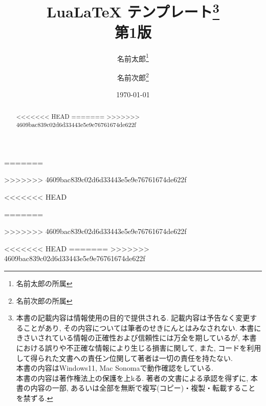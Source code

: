 \documentclass[11pt,a4paper, titlepage]{ltjsarticle}
\newcommand{\記}{\begin{center} 記 \end{center}}
\newcommand{\挨拶}{\noindent 拝啓 \ifcase\month\or 厳寒\or 春寒\or 早春
    \or 陽寒\or 新緑\or 向暑\or 猛暑\or 残暑\or 初秋\or 仲秋\or 晩秋\or 初冬
    \fi の候, ますますご清栄のこととお喜び申し上げます.}
\begin{document}
=======
\title{Lua\LaTeX{} テンプレート\footnote{本書の記載内容は情報使用の目的で提供される. 記載内容は予告なく変更することがあり, その内容については筆者のせきにんとはみなされない. 本書にきさいされている情報の正確性および信頼性には万全を期しているが, 本書における誤りや不正確な情報により生じる損害に関して, また,
        コードを利用して得られた文書への責任ン位関して著者は一切の責任を持たない.
        \\本書の内容はWindows11, Mac Sonomaで動作確認をしている.
        \\本書の内容は著作権法上の保護を上kる. 著者の文書による承認を得ずに,
        本書の内容の一部, あるいは全部を無断で複写(コピー)・複製・転載することを禁ずる.}
    \\第1版}
\author{名前太郎\thanks{名前太郎の所属} \and 名前次郎\thanks{名前次郎の所属}}
\date{\today}
\maketitle
>>>>>>> 4609bac839c02d6d33443e5e9e76761674de622f

\begin{abstract}
    <<<<<<< HEAD
    \lipsum[1-2]
    =======
    \lipsum[1-10]
    >>>>>>> 4609bac839c02d6d33443e5e9e76761674de622f
\end{abstract}

\tableofcontents
<<<<<<< HEAD
\newpage
\listoffigures
\newpage
=======
\listoffigures
>>>>>>> 4609bac839c02d6d33443e5e9e76761674de622f
\listoftables
\newpage
<<<<<<< HEAD
\makeatletter
{}
\makeatother
=======
>>>>>>> 4609bac839c02d6d33443e5e9e76761674de622f
\end{document}
